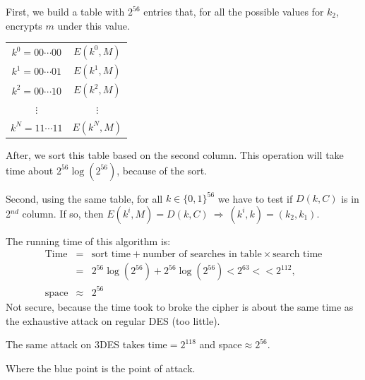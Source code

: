 \documentclass[12pt]{book}
\begin{document}
First, we build a table with $2^{56}$ entries that, for all the possible values for $k_{2}$, encrypts $m$ under this value.
\begin{center}
	\begin{tabular}{|c|c|}
		\hline
		$k^{0}=00\cdots00$&$E(k^{0},M)$\\
		$k^{1}=00\cdots01$&$E(k^{1},M)$\\
		$k^{2}=00\cdots10$&$E(k^{2},M)$\\
		$\vdots$&$\vdots$\\
		$k^{N}=11\cdots11$&$E(k^{N},M)$\\\hline
	\end{tabular}
\end{center}After, we sort this table based on the second column. This operation will take time about $2^{56}\log(2^{56})$, because of the sort.

Second, using the same table, for all $k\in\{0,1\}^{56}$ we have to test if $D(k,C)$ is in 2$^{nd}$ column. If so, then $E(k^{i},M)=D(k,C)\ \Rightarrow\ (k^{i},k)=(k_{2},k_{1})$.

The running time of this algorithm is:
$$\begin{array}{rcl}
	\text{Time}&=&\text{sort time}+\text{number of searches in table}\times\text{search time}\\[0.2cm]
	&=&2^{56}\log(2^{56})+2^{56}\log(2^{56})<2^{63}<<2^{112},\\[0.2cm]
	\text{space}&\approx&2^{56}
\end{array}$$Not secure, because the time took to broke the cipher is about the same time as the exhaustive attack on regular DES (too little).

The same attack on 3DES takes time$=2^{118}$ and space$\approx2^{56}$.
\begin{center}
\end{center}Where the blue point is the point of attack.
\end{document}
